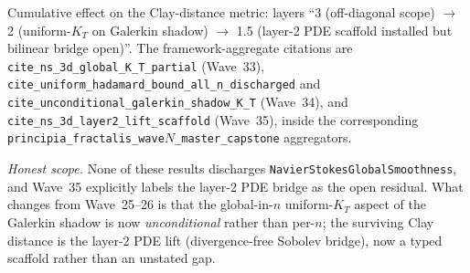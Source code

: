 \begin{remark}
\begin{itemize}
\end{itemize}
Cumulative effect on the Clay-distance metric: layers ``3 (off-diagonal scope) $\to$ 2 (uniform-$K_T$ on Galerkin shadow) $\to$ 1.5 (layer-2 PDE scaffold installed but bilinear bridge open)''. The framework-aggregate citations are \texttt{cite\_ns\_3d\_global\_K\_T\_partial} (Wave~33), \texttt{cite\_uniform\_hadamard\_bound\_all\_n\_discharged} and \texttt{cite\_unconditional\_galerkin\_shadow\_K\_T} (Wave~34), and \texttt{cite\_ns\_3d\_layer2\_lift\_scaffold} (Wave~35), inside the corresponding \texttt{principia\_fractalis\_wave$N$\_master\_capstone} aggregators.

\emph{Honest scope.} None of these results discharges \texttt{NavierStokesGlobalSmoothness}, and Wave~35 explicitly labels the layer-2 PDE bridge as the open residual. What changes from Wave~25--26 is that the global-in-$n$ uniform-$K_T$ aspect of the Galerkin shadow is now \emph{unconditional} rather than per-$n$; the surviving Clay distance is the layer-2 PDE lift (divergence-free Sobolev bridge), now a typed scaffold rather than an unstated gap.
\end{remark}


